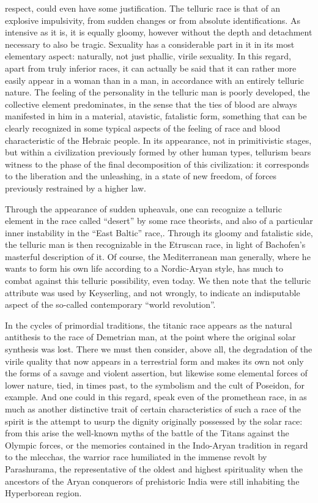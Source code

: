 respect, could even have some justification. The telluric race is that of an explosive impulsivity, from sudden changes or from absolute identifications. As intensive as it is, it is equally gloomy, however without the depth and detachment necessary to also be tragic. Sexuality has a considerable part in it in its most elementary aspect: naturally, not just phallic, virile sexuality. In this regard, apart from truly inferior races, it can actually be said that it can rather more easily appear in a woman than in a man, in accordance with an entirely telluric nature. The feeling of the personality in the telluric man is poorly developed, the collective element predominates, in the sense that the ties of blood are always manifested in him in a material, atavistic, fatalistic form, something that can be clearly recognized in some typical aspects of the feeling of race and blood characteristic of the Hebraic people. In its appearance, not in primitivistic stages, but within a civilization previously formed by other human types, tellurism bears witness to the phase of the final decomposition of this civilization: it corresponds to the liberation and the unleashing, in a state of new freedom, of forces previously restrained by a higher law.

Through the appearance of sudden upheavals, one can recognize a telluric element in the race called ``desert'' by some race theorists, and also of a particular inner instability in the ``East Baltic'' race,. Through its gloomy and fatalistic side, the telluric man is then recognizable in the Etruscan race, in light of Bachofen's masterful description of it. Of course, the Mediterranean man generally, where he wants to form his own life according to a Nordic-Aryan style, has much to combat against this telluric possibility, even today. We then note that the telluric attribute was used by Keyserling, and not wrongly, to indicate an indisputable aspect of the so-called contemporary ``world revolution''.

In the cycles of primordial traditions, the titanic race appears as the natural antithesis to the race of Demetrian man, at the point where the original solar synthesis was lost. There we must then consider, above all, the degradation of the virile quality that now appears in a terrestrial form and makes its own not only the forms of a savage and violent assertion, but likewise some elemental forces of lower nature, tied, in times past, to the symbolism and the cult of Poseidon, for example. And one could in this regard, speak even of the promethean race, in as much as another distinctive trait of certain characteristics of such a race of the spirit is the attempt to usurp the dignity originally possessed by the solar race: from this arise the well-known myths of the battle of the Titans against the Olympic forces, or the memories contained in the Indo-Aryan tradition in regard to the mlecchas, the warrior race humiliated in the immense revolt by Parashurama, the representative of the oldest and highest spirituality when the ancestors of the Aryan conquerors of prehistoric India were still inhabiting the Hyperborean region.


